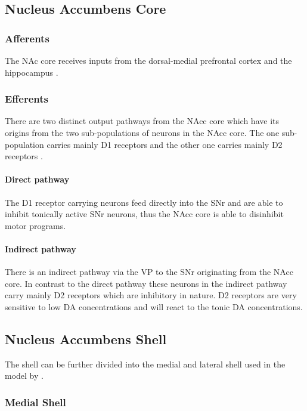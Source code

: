 \documentclass[12pt,a4paper]{article}
\begin{document}
\subsection{Nucleus Accumbens Core}

\subsubsection{Afferents}

The NAc core receives inputs from the dorsal-medial prefrontal cortex and the hippocampus \citep{brog93}.

\subsubsection{Efferents}

There are two distinct output pathways from the NAcc core which have its origins from the two sub-populations of neurons in the NAcc core. The one sub-population carries mainly D1 receptors and the other one carries mainly D2 receptors \citep{kelley04} \citep{Humphries2010}. 

\paragraph{Direct pathway}
The D1 receptor carrying neurons feed directly into the SNr and are able to inhibit tonically active SNr neurons, thus the NAcc core is able to disinhibit motor programs. 

\paragraph{Indirect pathway}
There is an indirect pathway via the VP to the SNr originating from the NAcc core. In contrast to the direct pathway these neurons in the indirect pathway carry mainly D2 receptors which are inhibitory in nature. D2 receptors are very sensitive to low DA concentrations and will react to the tonic DA concentrations. 




\subsection{Nucleus Accumbens Shell}

The shell can be further divided into the medial and lateral shell \citep{Ikemoto2007} \citep{Usuda1998} used in the model by \citep{Humphries2010}.

\subsubsection{Medial Shell}
\end{document}
